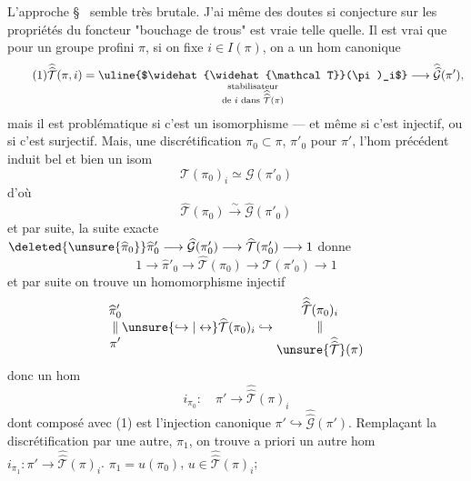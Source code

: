 L'approche  \S\  semble  très brutale. J'ai même des doutes si   conjecture sur les propriétés du foncteur "bouchage de trous" est vraie telle quelle. Il est vrai que pour un groupe profini    $\pi$, si on fixe $i\in I(\pi)$, on a un hom canonique
\[
\tag{1}
\widehat{\widehat{\mathcal T}}(\pi,i)
=\underset{\substack{\text{stabilisateur}\\\text{de }i\text{ dans }\widehat{\widehat{\mathcal T}}(\pi)}}{\text{\uline{$\widehat{\widehat{\mathcal T}}(\pi)_i$}}}
\longrightarrow \widehat{\widehat{\mathcal G}}(\pi'),
\]
mais il est problématique si c'est un isomorphisme --- et même si c'est injectif, ou si c'est surjectif. Mais,  une discrétification $\pi_0\subset\pi$,   $\pi'_0$ pour $\pi'$, l'hom précédent induit bel et bien un isom
\[
\tag{1}
\mathcal T(\pi_0)_i\simeq\mathcal G(\pi'_0)
\]
d'où
\[
\tag{3}
\widehat{\mathcal T}(\pi_0)\xrightarrow{\sim}\widehat{\mathcal G}(\pi'_0)
\]
et par suite, la suite exacte $\deleted{\unsure{\widehat{\pi}_0}}\widehat{\pi}'_0\longrightarrow\widehat{\mathcal G}(\pi'_0)\longrightarrow\widehat{\mathcal T}(\pi'_0)\longrightarrow 1$ donne
\[
\tag{4}
1\longrightarrow\widehat{\pi}'_0\longrightarrow\widehat{\mathcal T}(\pi_0)\longrightarrow\widehat{\mathcal T}(\pi'_0)\longrightarrow 1
\]
et par suite on trouve un homomorphisme injectif
\[
\begin{gathered}\widehat{\pi}'_0\\[-0.5ex]\Vert\\[-0.5ex]\pi'\end{gathered}
\unsure{\hookrightarrow|\leftrightarrow}
\widehat{\mathcal T}(\pi_0)_i
\hookrightarrow
\begin{gathered}\widehat{\widehat{\mathcal T}}(\pi_0)_i\\[-0.5ex]\Vert\\[-0.5ex]\unsure{\widehat{\widehat{\mathcal T}}}(\pi)\end{gathered}
\]
donc un hom
\[
\tag{5}
i_{\pi_0}:\quad\pi'\longrightarrow\widehat{\widehat{\mathcal T}}(\pi)_i
\]
dont  composé avec (1) est l'injection canonique $\pi'\hookrightarrow\widehat{\widehat{\mathcal G}}(\pi')$. Remplaçant la discrétification  par une autre, $\pi_1$, on trouve a priori un autre hom $i_{\pi_1}:\pi'\longrightarrow\widehat{\widehat{\mathcal T}}(\pi)_i$.  $\pi_1=u(\pi_0)$, $u\in\widehat{\widehat{\mathcal T}}(\pi)_i$;

